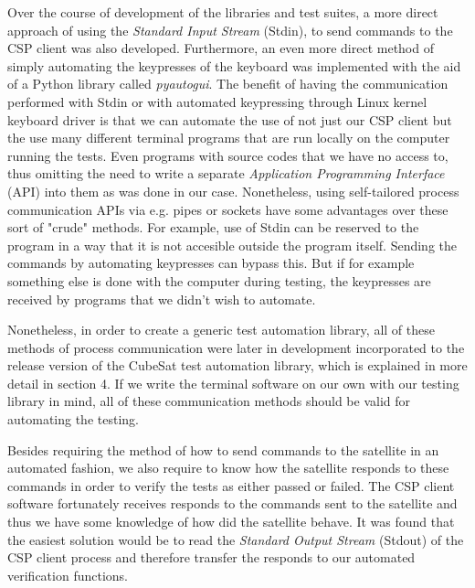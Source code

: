 \documentclass[english,12pt,a4paper,pdftex,elec,utf8]{aaltothesis}
\begin{document}
Over the course of development of the libraries and test suites, a more direct approach of using the \textit{Standard Input Stream} (Stdin), to send commands to the CSP client was also developed. Furthermore, an even more direct method of simply automating the keypresses of the keyboard was implemented with the aid of a Python library called \textit{pyautogui}. The benefit of having the communication performed with Stdin or with automated keypressing through Linux kernel keyboard driver is that we can automate the use of not just our CSP client but the use many different terminal programs that are run locally on the computer running the tests. Even programs with source codes that we have no access to, thus omitting the need to write a separate \textit{Application Programming Interface} (API) into them as was done in our case. Nonetheless, using self-tailored process communication APIs via e.g. pipes or sockets have some advantages over these sort of "crude" methods. For example, use of Stdin can be reserved to the program in a way that it is not accesible outside the program itself. Sending the commands by automating keypresses can bypass this. But if for example something else is done with the computer during testing, the keypresses are received by programs that we didn't wish to automate.\par
Nonetheless, in order to create a generic test automation library, all of these methods of process communication were later in development incorporated to the release version of the CubeSat test automation library, which is explained in more detail in section 4.
If we write the terminal software on our own with our testing library in mind, all of these communication methods should be valid for automating the testing.  \par 
Besides requiring the method of how to send commands to the satellite in an automated fashion, we also require to know how the satellite responds to these commands in order to verify the tests as either passed or failed. The CSP client software fortunately receives responds to the commands sent to the satellite and thus we have some knowledge of how did the satellite behave. It was found that the easiest solution would be to read the \textit{Standard Output Stream} (Stdout) of the CSP client process and therefore transfer the responds to our automated verification functions.\par
\end{document}
